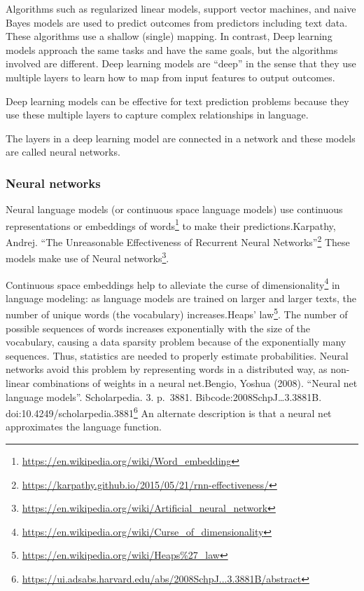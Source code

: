 \documentclass[
]{article}
\DeclareRobustCommand{\href}[2]{#2\footnote{\url{#1}}}
\begin{document}
Algorithms such as regularized linear models, support vector machines,
and naive Bayes models are used to predict outcomes from predictors
including text data. These algorithms use a shallow (single) mapping. In
contrast, Deep learning models approach the same tasks and have the same
goals, but the algorithms involved are different. Deep learning models
are ``deep'' in the sense that they use multiple layers to learn how to
map from input features to output outcomes.

Deep learning models can be effective for text prediction problems
because they use these multiple layers to capture complex relationships
in language.

The layers in a deep learning model are connected in a network and these
models are called neural networks.

\hypertarget{neural-networks}{%
\subsubsection{Neural networks}\label{neural-networks}}

Neural language models (or continuous space language models) use
continuous representations or
\href{https://en.wikipedia.org/wiki/Word_embedding}{embeddings of words}
to make their
predictions.\href{https://karpathy.github.io/2015/05/21/rnn-effectiveness/}{Karpathy,
Andrej. ``The Unreasonable Effectiveness of Recurrent Neural Networks''}
These models make use of
\href{https://en.wikipedia.org/wiki/Artificial_neural_network}{Neural
networks}.

Continuous space embeddings help to alleviate the
\href{https://en.wikipedia.org/wiki/Curse_of_dimensionality}{curse of
dimensionality} in language modeling: as language models are trained on
larger and larger texts, the number of unique words (the vocabulary)
increases.\href{https://en.wikipedia.org/wiki/Heaps\%27_law}{Heaps'
law}. The number of possible sequences of words increases exponentially
with the size of the vocabulary, causing a data sparsity problem because
of the exponentially many sequences. Thus, statistics are needed to
properly estimate probabilities. Neural networks avoid this problem by
representing words in a distributed way, as non-linear combinations of
weights in a neural
net.\href{https://ui.adsabs.harvard.edu/abs/2008SchpJ...3.3881B/abstract}{Bengio,
Yoshua (2008). ``Neural net language models''. Scholarpedia. 3. p.~3881.
Bibcode:2008SchpJ\ldots3.3881B. doi:10.4249/scholarpedia.3881} An
alternate description is that a neural net approximates the language
function.
\end{document}
